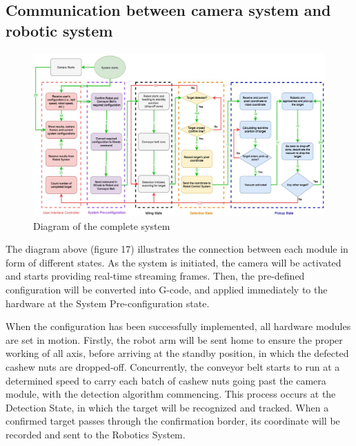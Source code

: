 \documentclass[10pt, letterpaper]{article}
\begin{document}
\subsection{Communication between camera system and robotic system}
    \begin{figure}[h]
        \centering
        \includegraphics[width=\textwidth]{fig17.JPG}
        \caption{Diagram of the complete system}
    \end{figure}
    The diagram above (figure 17) illustrates the connection between each module in form of different states. As the system is initiated, the camera will be activated and starts providing real-time streaming frames. Then, the pre-defined configuration will be converted into G-code, and applied immediately to the hardware at the System Pre-configuration state. \par
    When the configuration has been successfully implemented, all hardware modules are set in motion. Firstly, the robot arm will be sent home to ensure the proper working of all axis, before arriving at the standby position, in which the defected cashew nuts are dropped-off. Concurrently, the conveyor belt starts to run at a determined speed to carry each batch of cashew nuts going past the camera module, with the detection algorithm commencing. This process occurs at the Detection State, in which the target will be recognized and tracked. When a confirmed target passes through the confirmation border, its coordinate will be recorded and sent to the Robotics System. \par
\end{document}
